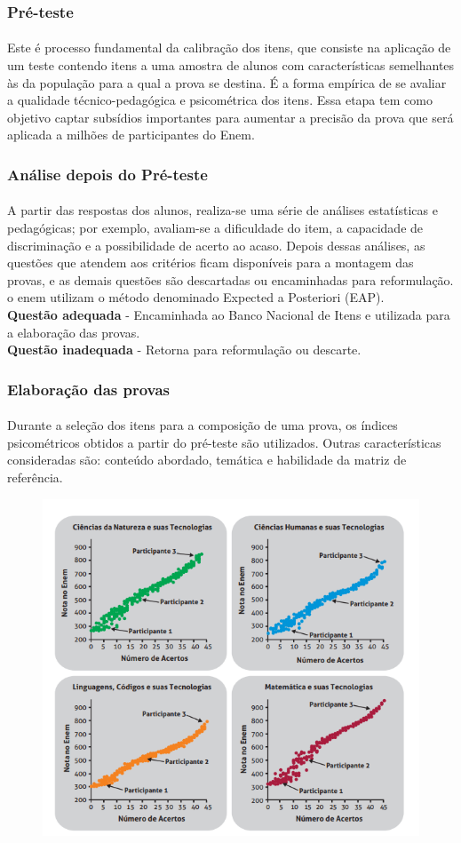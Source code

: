     \subsubsection{Pré-teste}
    \paragraph{}
    	Este é processo fundamental da calibração dos itens, que consiste na aplicação de um teste contendo itens a uma amostra de alunos com características semelhantes às da população para a qual a prova se destina. É a forma empírica de se avaliar a qualidade técnico-pedagógica e psicométrica dos itens. Essa etapa tem como objetivo captar subsídios importantes para aumentar a precisão da prova que será aplicada a milhões de participantes do Enem.
    \subsubsection{Análise depois do Pré-teste}
    \paragraph{}
	    A partir das respostas dos alunos, realiza-se uma série de análises estatísticas e pedagógicas; por exemplo, avaliam-se a dificuldade do item, a capacidade de discriminação e a possibilidade de acerto ao acaso. Depois dessas análises, as questões que atendem aos critérios ficam disponíveis para a montagem das provas, e as demais questões são descartadas ou encaminhadas para reformulação. o enem utilizam o método denominado Expected a Posteriori (EAP).\\
	    \textbf{Questão adequada} - Encaminhada ao Banco Nacional de Itens e utilizada para a elaboração das provas.\\
	    \textbf{Questão inadequada} - Retorna para reformulação ou descarte.\\
	\subsubsection{Elaboração das provas}
	\paragraph{}
    	Durante a seleção dos itens para a composição de uma prova, os índices psicométricos obtidos a partir do pré-teste são utilizados. Outras características consideradas são: conteúdo abordado, temática e habilidade da matriz de referência.
	\begin{figure}[!h]
		\centering
		\includegraphics[width=0.4\linewidth]{img/acero}
		\caption{}
		\label{fig:acero}
	\end{figure}
